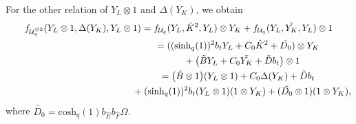 \documentclass[10pt,a4paper]{amsart}
\numberwithin{equation}{section}
\newcommand{\chq}{\mathrm{cosh}_q}
\newcommand{\shq}{\mathrm{sinh}_q}
\newcommand{\tensor}[1]{^{\otimes{#1}}}
\newcommand{\Uq}{\mathcal{U}_q}
\begin{document}
For the other relation of $Y_L\otimes 1$ and $\Delta(Y_K)$, we obtain
\begin{gather*}
	f_{\Uq\tensor{2}}(Y_L\otimes 1,\Delta(Y_K),Y_L\otimes 1) = f_{\Uq}(Y_L,\hat{K}^2,Y_L)\otimes Y_K + f_{\Uq}(Y_L,\tilde{Y_K},Y_L)\otimes 1\\
\hphantom{f_{\Uq\tensor{2}}(Y_L\otimes 1,\Delta(Y_K),Y_L\otimes 1)}{}
	= ((\shq(1))^2b_t Y_L+C_0\hat{K}^2+\tilde{D_0})\otimes Y_K \\
\hphantom{f_{\Uq\tensor{2}}(Y_L\otimes 1,\Delta(Y_K),Y_L\otimes 1)=}{}
 + \big(\tilde{B}Y_L+C_0\tilde{Y_K}+\tilde{D}b_t\big)\otimes 1\\
\hphantom{f_{\Uq\tensor{2}}(Y_L\otimes 1,\Delta(Y_K),Y_L\otimes 1)}{}
	= \big(\tilde{B}\otimes 1\big)(Y_L\otimes 1)+ C_0 \Delta(Y_K)+\tilde{D}b_t \\
\hphantom{f_{\Uq\tensor{2}}(Y_L\otimes 1,\Delta(Y_K),Y_L\otimes 1)=}{}
	+(\shq(1))^2b_t(Y_L\otimes 1)(1\otimes Y_K) + (\tilde{D_0}\otimes 1)(1\otimes Y_K),
\end{gather*}
where $\tilde{D_0}=\chq(1)b_{\hat{E}}b_{\hat{F}}\Omega$.
\end{document}
